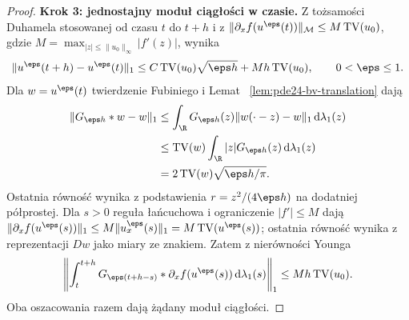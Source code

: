 \begin{proof}
\textbf{Krok 3: jednostajny moduł ciągłości w czasie.}
Z tożsamości Duhamela stosowanej od czasu $t$ do $t+h$
i z $\|\partial_x f(u^\eps(t))\|_{\mathcal M}\le
M\operatorname{TV}(u_0)$, gdzie
$M=\max_{|z|\le\|u_0\|_\infty}|f'(z)|$, wynika
\[
 \|u^\eps(t+h)-u^\eps(t)\|_1
 \le C\operatorname{TV}(u_0)\sqrt{\eps h}
 +Mh\operatorname{TV}(u_0),\qquad 0<\eps\le1.
\]
Dla $w=u^\eps(t)$ twierdzenie Fubiniego i Lemat
~\ref{lem:pde24-bv-translation} dają
\[
 \begin{aligned}
 \|G_{\eps h}*w-w\|_1
 &\le \int_\R G_{\eps h}(z)\|w(\cdot-z)-w\|_1\,
       \mathrm d\lambda_1(z)\\
 &\le \operatorname{TV}(w)
       \int_\R |z|G_{\eps h}(z)\,\mathrm d\lambda_1(z)\\
 &=2\operatorname{TV}(w)\sqrt{\eps h/\pi}.
 \end{aligned}
\]
Ostatnia równość wynika z podstawienia
$r=z^2/(4\eps h)$ na dodatniej półprostej.
Dla $s>0$ reguła łańcuchowa i ograniczenie
$|f'|\le M$ dają
$\|\partial_x f(u^\eps(s))\|_1
\le M\|u_x^\eps(s)\|_1
=M\operatorname{TV}(u^\eps(s))$;
ostatnia równość wynika z reprezentacji $Dw$ jako
miary ze znakiem. Zatem z nierówności Younga
\[
 \left\|\int_t^{t+h}G_{\eps(t+h-s)}*
 \partial_x f(u^\eps(s))\,\mathrm d\lambda_1(s)\right\|_1
 \le Mh\operatorname{TV}(u_0).
\]
Oba oszacowania razem dają żądany moduł ciągłości.


\end{proof}
